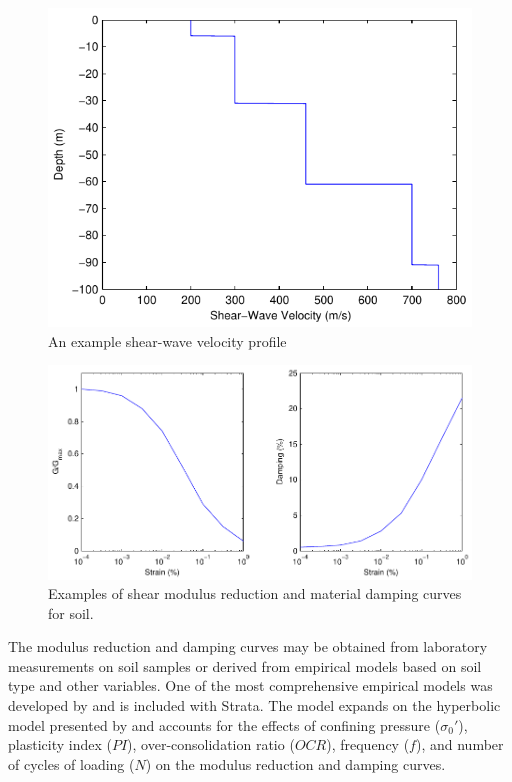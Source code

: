 \documentclass[11pt]{report}
\begin{document}
\begin{figure}[tb]
  \begin{center}
	\includegraphics{figures/siteResponse/vsProfile.pdf}
  \end{center}
  \caption{An example shear-wave velocity profile}
  \label{fig:siteResponse:vsProfile}
\end{figure}
\begin{figure}[tb]
  \centering
  \includegraphics[width=\textwidth]{figures/siteResponse/nlLab.pdf}
  \caption{Examples of shear modulus reduction and material damping curves for soil.}
  \label{fig:siteResponse:nlLab}
\end{figure}

The modulus reduction and damping curves may be obtained from laboratory measurements on soil
samples or derived from empirical models based on soil type and other variables.  One of the most
comprehensive empirical models was developed by \citet{darendeli:01} and is included with Strata.
The model expands on the hyperbolic model presented by \citet{hardin:72} and accounts for the
effects of confining pressure ($\sigma_0'$), plasticity index ($PI$), over-consolidation ratio
($OCR$), frequency ($f$), and number of cycles of loading ($N$) on the modulus reduction and damping
curves. 
\end{document}

